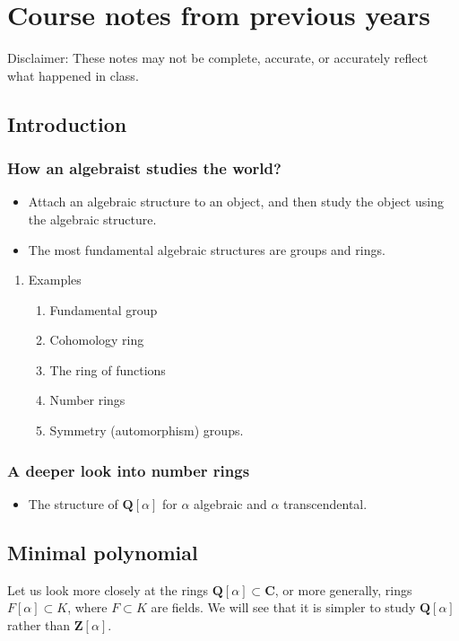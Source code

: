 \documentclass[11pt]{article}
\begin{document}
\section{Course notes from previous years}
\label{sec:org2e5d853}
Disclaimer: These notes may not be complete, accurate, or accurately reflect what happened in class.
\subsection{Introduction}
\label{sec:org97752bc}
\subsubsection{How an algebraist studies the world?}
\label{sec:org34ec4df}

\begin{itemize}
\item Attach an algebraic structure to an object, and then study the object using the algebraic structure.
\item The most fundamental algebraic structures are groups and rings.
\end{itemize}
\begin{enumerate}
\item Examples
\label{sec:org780949c}

\begin{enumerate}
\item Fundamental group
\item Cohomology ring
\item The ring of functions
\item Number rings
\item Symmetry (automorphism) groups.
\end{enumerate}
\end{enumerate}
\subsubsection{A deeper look into number rings}
\label{sec:org3325b7a}

\begin{itemize}
\item The structure of \(\mathbf{Q}[\alpha]\) for \(\alpha\) algebraic and \(\alpha\) transcendental.
\end{itemize}
\subsection{Minimal polynomial}
\label{sec:org55fab74}
Let us look more closely at the rings \(\mathbf{Q}[\alpha] \subset \mathbf{C}\), or more generally, rings \(F[\alpha] \subset K\), where \(F \subset K\) are fields.
We will see that it is simpler to study \(\mathbf{Q}[\alpha]\) rather than \(\mathbf{Z}[\alpha]\).
\end{document}
